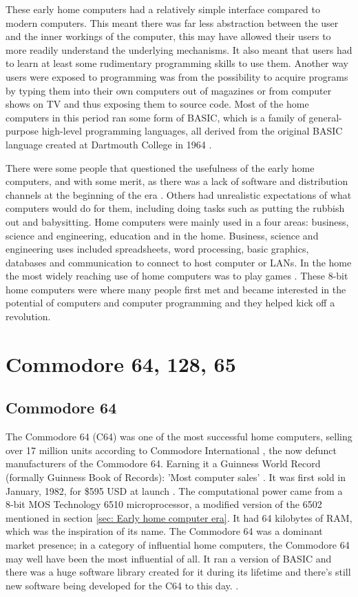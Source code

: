 These early home computers had a relatively simple interface compared to modern computers. This meant there was far less abstraction between the user and the inner workings of the computer, this may have allowed their users to more readily understand the underlying mechanisms. It also meant that users had to learn at least some rudimentary programming skills to use them. Another way users were exposed to programming was from the possibility to acquire programs by typing them into their own computers out of magazines or from computer shows on TV and thus exposing them to source code. Most of the home computers in this period ran some form of BASIC, which is a family of general-purpose high-level programming languages, all derived from the original BASIC language created at Dartmouth College in 1964
\cite{RN130}. 

There were some people that questioned the usefulness of the early home computers, and with some merit, as there was a lack of software and distribution channels at the beginning of the era
\cite{RN23}. Others had unrealistic expectations of what computers would do for them, including doing tasks such as putting the rubbish out and babysitting. Home computers were mainly used in a four areas: business, science and engineering, education and in the home. Business, science and engineering uses included spreadsheets, word processing, basic graphics, databases and communication to connect to host computer or LANs. In the home the most widely reaching use of home computers was to play games 
\cite{RN24}. These 8-bit home computers were where many people first met and became interested in the potential of computers and computer programming and they helped kick off a revolution.


\section{Commodore 64, 128, 65}
\subsection{Commodore 64}
The Commodore 64 (C64) was one of the most successful home computers, selling over 17 million units according to Commodore International 
\cite{RN42}, the now defunct manufacturers of the Commodore 64. Earning it a Guinness World Record (formally Guinness Book of Records): 'Most computer sales'
\cite{RN43}.
It was first sold in January, 1982, for \$595 USD at launch 
\cite{RN28}. The computational power came from a 8-bit MOS Technology 6510 microprocessor, a modified version of the 6502 mentioned in section \ref{sec: Early home computer era}. It had 64 kilobytes of RAM, which was the inspiration of its name. The Commodore 64 was a dominant market presence; in a category of influential home computers, the Commodore 64 may well have been the most influential of all. It ran a version of BASIC and there was a huge software library created for it during its lifetime and there's still new software being developed for the C64 to this day.
\cite{RN82}\cite{RN83}\cite{RN84}.

